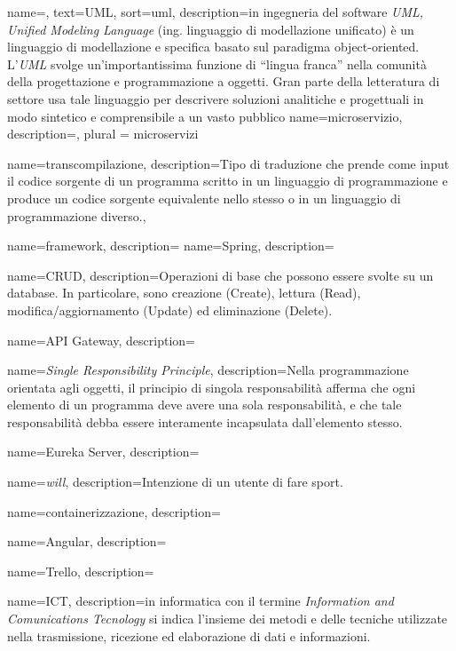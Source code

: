 {
    name=,
    text=UML,
    sort=uml,
    description={in ingegneria del software \emph{UML, Unified Modeling Language} (ing. linguaggio di modellazione unificato) è un linguaggio di modellazione e specifica basato sul paradigma object-oriented. L'\emph{UML} svolge un'importantissima funzione di ``lingua franca'' nella comunità della progettazione e programmazione a oggetti. Gran parte della letteratura di settore usa tale linguaggio per descrivere soluzioni analitiche e progettuali in modo sintetico e comprensibile a un vasto pubblico}
}
{
    name={microservizio},
    description={},
    plural = {microservizi}
}

{
    name={transcompilazione},
    description={Tipo di traduzione 
    che prende come input il codice sorgente di un programma scritto in un linguaggio di programmazione e produce un codice sorgente equivalente nello stesso o in un linguaggio di programmazione diverso.},
}


{
    name={framework},
    description={}
}
{
    name={Spring},
    description={}
}

{
    name={CRUD},
    description={Operazioni di base che possono essere svolte su un database. In particolare,
    sono creazione (Create), lettura (Read), modifica/aggiornamento (Update) ed
    eliminazione (Delete).}
}

{
    name={API Gateway},
    description={}
}


{
    name=\textit{Single Responsibility Principle},
    description={Nella programmazione orientata agli oggetti, il principio di singola responsabilità afferma che ogni elemento di un programma deve avere una sola responsabilità, e che tale responsabilità debba essere interamente incapsulata dall'elemento stesso.}
}

{
    name={Eureka Server},
    description={}
}


{
    name={\textit{will}},
    description={Intenzione di un utente di fare sport.}
}


{
    name={containerizzazione},
    description={}
}

{
    name={Angular},
    description={}
}

{
    name={Trello},
    description={}
}

{
    name={ICT},
    description={in informatica con il termine \textit{Information and Comunications Tecnology} 
    si indica l'insieme dei metodi e delle tecniche utilizzate nella trasmissione, ricezione 
    ed elaborazione di dati e informazioni.}
}


